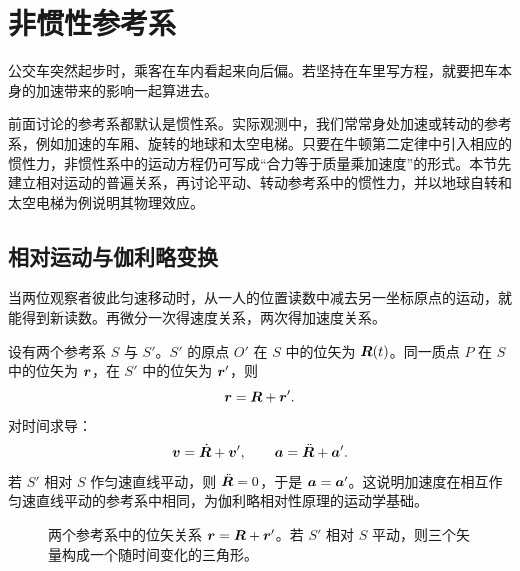 \section{非惯性参考系}

公交车突然起步时，乘客在车内看起来向后偏。若坚持在车里写方程，就要把车本身的加速带来的影响一起算进去。

前面讨论的参考系都默认是惯性系。实际观测中，我们常常身处加速或转动的参考系，例如加速的车厢、旋转的地球和太空电梯。只要在牛顿第二定律中引入相应的惯性力，非惯性系中的运动方程仍可写成“合力等于质量乘加速度”的形式。本节先建立相对运动的普遍关系，再讨论平动、转动参考系中的惯性力，并以地球自转和太空电梯为例说明其物理效应。

\subsection{相对运动与伽利略变换}

当两位观察者彼此匀速移动时，从一人的位置读数中减去另一坐标原点的运动，就能得到新读数。再微分一次得速度关系，两次得加速度关系。

设有两个参考系 $S$ 与 $S'$。$S'$ 的原点 $O'$ 在 $S$ 中的位矢为 $\boldsymbol{R}(t)$。同一质点 $P$ 在 $S$ 中的位矢为 $\boldsymbol{r}$，在 $S'$ 中的位矢为 $\boldsymbol{r}'$，则
\begin{equation}
\boldsymbol{r}=\boldsymbol{R}+\boldsymbol{r}'.
\label{eq:relative-position}
\end{equation}
对时间求导：
\begin{equation}
\boldsymbol{v}=\dot{\boldsymbol{R}}+\boldsymbol{v}',\qquad
\boldsymbol{a}=\ddot{\boldsymbol{R}}+\boldsymbol{a}'.
\label{eq:relative-velocity}
\end{equation}
若 $S'$ 相对 $S$ 作匀速直线平动，则 $\ddot{\boldsymbol{R}}=0$，于是 $\boldsymbol{a}=\boldsymbol{a}'$。这说明加速度在相互作匀速直线平动的参考系中相同，为伽利略相对性原理的运动学基础。

\begin{figure}[htbp]
\centering
{}
\caption{两个参考系中的位矢关系 $\boldsymbol{r}=\boldsymbol{R}+\boldsymbol{r}'$。若 $S'$ 相对 $S$ 平动，则三个矢量构成一个随时间变化的三角形。}
\label{fig:frames}
\end{figure}

